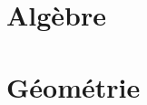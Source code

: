\documentclass[french,PubliClass=book,ColorTheme=Steel,FontSize=11pt,
StylisticSet={parallelslant,leqslant}]{tango}
\begin{document}
\frontmatter
\tableofcontents
\mainmatter
\part{Algèbre}



\part{Géométrie}


\backmatter
\end{document}
